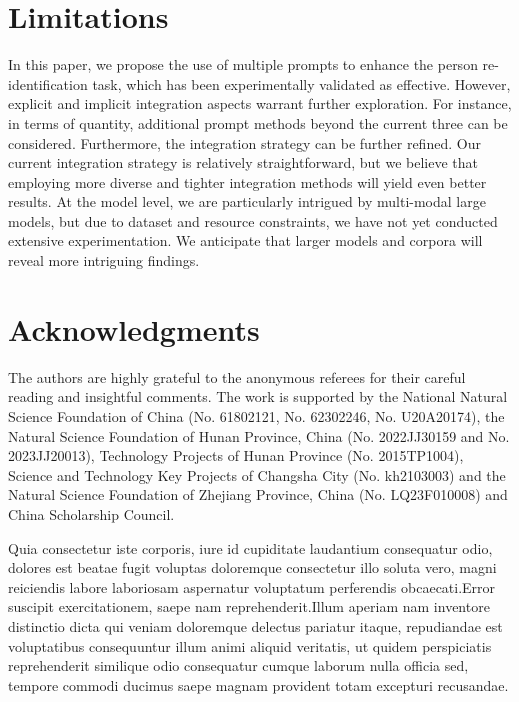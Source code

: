 \documentclass[letterpaper]{article} %
\begin{document}
\section*{Limitations}
In this paper, we propose the use of multiple prompts to enhance the person re-identification task, which has been experimentally validated as effective. However, explicit and implicit integration aspects warrant further exploration. For instance, in terms of quantity, additional prompt methods beyond the current three can be considered. Furthermore, the integration strategy can be further refined. Our current integration strategy is relatively straightforward, but we believe that employing more diverse and tighter integration methods will yield even better results. At the model level, we are particularly intrigued by multi-modal large models, but due to dataset and resource constraints, we have not yet conducted extensive experimentation. We anticipate that larger models and corpora will reveal more intriguing findings.

\section{Acknowledgments}
The authors are highly grateful to the anonymous referees for their careful reading and insightful comments. The work is supported by the National Natural Science Foundation of China (No. 61802121, No. 62302246, No. U20A20174), the Natural Science Foundation of Hunan Province, China (No. 2022JJ30159 and No. 2023JJ20013), Technology Projects of Hunan Province (No. 2015TP1004), Science and Technology Key Projects of Changsha City (No. kh2103003) and the Natural Science Foundation of Zhejiang Province, China (No. LQ23F010008) and China Scholarship Council.

\bigskip

Quia consectetur iste corporis, iure id cupiditate laudantium consequatur odio, dolores est beatae fugit voluptas doloremque consectetur illo soluta vero, magni reiciendis labore laboriosam aspernatur voluptatum perferendis obcaecati.Error suscipit exercitationem, saepe nam reprehenderit.Illum aperiam nam inventore distinctio dicta qui veniam doloremque delectus pariatur itaque, repudiandae est voluptatibus consequuntur illum animi aliquid veritatis, ut quidem perspiciatis reprehenderit similique odio consequatur cumque laborum nulla officia sed, tempore commodi ducimus saepe magnam provident totam excepturi recusandae.\clearpage

\end{document}
